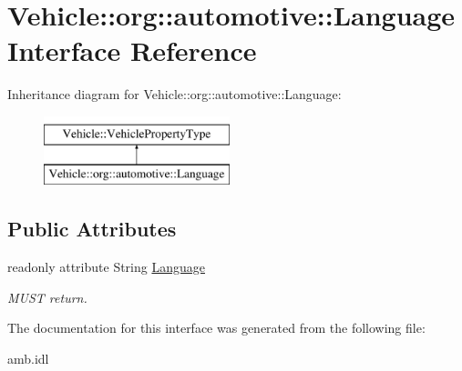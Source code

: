 \hypertarget{interfaceVehicle_1_1org_1_1automotive_1_1Language}{\section{Vehicle\-:\-:org\-:\-:automotive\-:\-:Language Interface Reference}
\label{interfaceVehicle_1_1org_1_1automotive_1_1Language}
}
Inheritance diagram for Vehicle\-:\-:org\-:\-:automotive\-:\-:Language\-:\begin{figure}[H]
\begin{center}
\leavevmode
\includegraphics[height=2.000000cm]{interfaceVehicle_1_1org_1_1automotive_1_1Language}
\end{center}
\end{figure}
\subsection*{Public Attributes}
\begin{DoxyCompactItemize}
\item 
\hypertarget{interfaceVehicle_1_1org_1_1automotive_1_1Language_a192fd77d9e3eab521eadfce3366165b0}{readonly attribute String \hyperlink{interfaceVehicle_1_1org_1_1automotive_1_1Language_a192fd77d9e3eab521eadfce3366165b0}{Language}}\label{interfaceVehicle_1_1org_1_1automotive_1_1Language_a192fd77d9e3eab521eadfce3366165b0}

\begin{DoxyCompactList}\small\item\em M\-U\-S\-T return. \end{DoxyCompactList}\end{DoxyCompactItemize}


The documentation for this interface was generated from the following file\-:\begin{DoxyCompactItemize}
\item 
amb.\-idl\end{DoxyCompactItemize}
